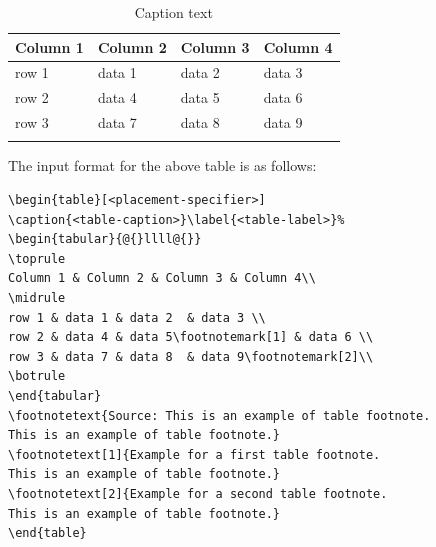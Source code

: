 \documentclass[
	a4paper, %
	10pt, %
	unnumberedsections, %
	twoside, %
]{LTJournalArticle}
\begin{document}
\begin{table}[h]
\caption{Caption text}\label{tab1}%
\begin{tabular}{@{}llll@{}}
\toprule
Column 1 & Column 2  & Column 3 & Column 4\\
\midrule
row 1    & data 1   & data 2  & data 3  \\
row 2    & data 4   & data 5\footnotemark[1]  & data 6  \\
row 3    & data 7   & data 8  & data 9\footnotemark[2]  \\
\botrule
\end{tabular}
\end{table}

\noindent
The input format for the above table is as follows:

\bigskip
\begin{verbatim}
\begin{table}[<placement-specifier>]
\caption{<table-caption>}\label{<table-label>}%
\begin{tabular}{@{}llll@{}}
\toprule
Column 1 & Column 2 & Column 3 & Column 4\\
\midrule
row 1 & data 1 & data 2	 & data 3 \\
row 2 & data 4 & data 5\footnotemark[1] & data 6 \\
row 3 & data 7 & data 8	 & data 9\footnotemark[2]\\
\botrule
\end{tabular}
\footnotetext{Source: This is an example of table footnote. 
This is an example of table footnote.}
\footnotetext[1]{Example for a first table footnote.
This is an example of table footnote.}
\footnotetext[2]{Example for a second table footnote. 
This is an example of table footnote.}
\end{table}
\end{verbatim}
\bigskip
\end{document}
